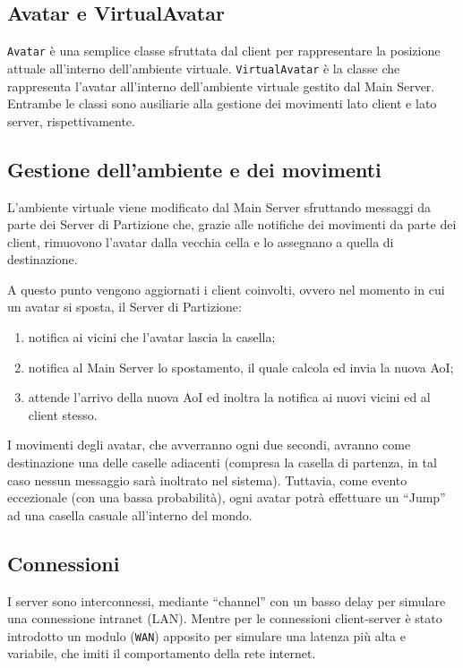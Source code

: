 \documentclass[a4paper, 11pt, oneside]{book}
\theoremstyle{definition}
\theoremstyle{remark}
\begin{document}
\subsection{Avatar e VirtualAvatar}
\texttt{Avatar} è una semplice classe sfruttata dal client per rappresentare
la posizione attuale all'interno dell'ambiente virtuale.
\texttt{VirtualAvatar} è la classe che rappresenta l'avatar all'interno
dell'ambiente virtuale gestito dal Main Server. Entrambe le classi sono
ausiliarie alla gestione dei movimenti lato client e lato server,
rispettivamente.


\subsection{Gestione dell'ambiente e dei movimenti}
L'ambiente virtuale viene modificato dal Main Server sfruttando messaggi da
parte
dei Server di Partizione che, grazie alle notifiche dei
movimenti da parte dei client, rimuovono l'avatar dalla vecchia cella
e lo assegnano a quella di destinazione.

A questo punto vengono aggiornati i client coinvolti, ovvero nel momento
in cui un avatar si sposta, il Server di Partizione:
\begin{enumerate}
\item
notifica ai vicini che l'avatar lascia la casella;
\item
notifica al Main Server lo spostamento, il quale calcola ed invia la nuova
AoI;
\item
attende l'arrivo della nuova AoI ed inoltra la notifica ai nuovi vicini ed al
client stesso.
\end{enumerate}

I movimenti degli avatar, che avverranno ogni due secondi, avranno come
destinazione una delle caselle adiacenti (compresa la casella di partenza,
in tal caso nessun messaggio sarà inoltrato nel sistema). Tuttavia,
come evento eccezionale (con una bassa probabilità), ogni avatar potrà
effettuare un ``Jump'' ad una casella casuale all'interno del mondo.

\subsection{Connessioni}
I server sono interconnessi, mediante ``channel'' con un basso delay
per simulare una connessione intranet (LAN). Mentre per le connessioni
client-server è stato introdotto un modulo (\texttt{WAN}) apposito per simulare
una latenza più alta e variabile, che imiti il comportamento della rete
internet.
\end{document}
